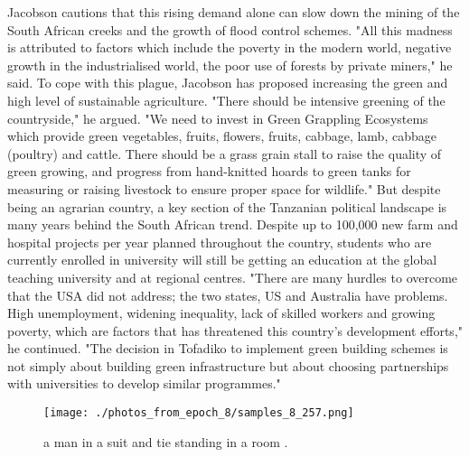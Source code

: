 \documentclass{article}%
\begin{document}
Jacobson cautions that this rising demand alone can slow down the mining of the South African creeks and the growth of flood control schemes. "All this madness is attributed to factors which include the poverty in the modern world, negative growth in the industrialised world, the poor use of forests by private miners," he said.\newline%
To cope with this plague, Jacobson has proposed increasing the green and high level of sustainable agriculture. "There should be intensive greening of the countryside," he argued. "We need to invest in Green Grappling Ecosystems which provide green vegetables, fruits, flowers, fruits, cabbage, lamb, cabbage (poultry) and cattle. There should be a grass grain stall to raise the quality of green growing, and progress from hand{-}knitted hoards to green tanks for measuring or raising livestock to ensure proper space for wildlife."\newline%
But despite being an agrarian country, a key section of the Tanzanian political landscape is many years behind the South African trend. Despite up to 100,000 new farm and hospital projects per year planned throughout the country, students who are currently enrolled in university will still be getting an education at the global teaching university and at regional centres.\newline%
"There are many hurdles to overcome that the USA did not address; the two states, US and Australia have problems. High unemployment, widening inequality, lack of skilled workers and growing poverty, which are factors that has threatened this country's development efforts," he continued. "The decision in Tofadiko to implement green building schemes is not simply about building green infrastructure but about choosing partnerships with universities to develop similar programmes."\newline%

%


\begin{figure}[h!]%
\centering%
\texttt{[image: ./photos\_from\_epoch\_8/samples\_8\_257.png]}%
\caption{a man in a suit and tie standing in a room .}%
\end{figure}

%
\end{document}
